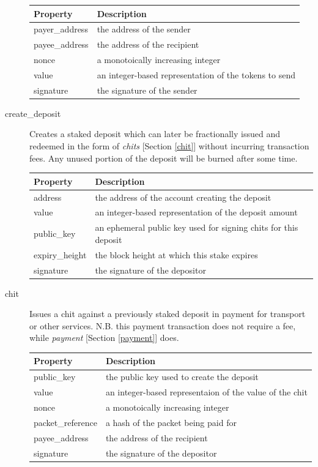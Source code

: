 \documentclass[10pt, nonatbib, nocopyrightspace, reprint]{sigplanconf}
\begin{document}
\begin{description}
\begin{table}[H]
  \centering
  \begin{tabularx}{\columnwidth}{l X}
      \toprule
      Property & Description \\ \midrule
      payer\_address & the address of the sender \\
      payee\_address & the address of the recipient \\
      nonce & a monotoically increasing integer \\
      value & an integer-based representation of the tokens to send \\
      signature & the signature of the sender
  \end{tabularx}
\end{table}

\item [create\_deposit] Creates a staked deposit which can later be fractionally issued and redeemed in the form of \emph{chits} [Section \ref{chit}] without incurring transaction fees. Any unused portion of the deposit will be burned after some time.

\begin{table}[H]
  \centering
  \begin{tabularx}{\columnwidth}{l X}
      \toprule
      Property & Description \\ \midrule
      address & the address of the account creating the deposit \\
      value & an integer-based representation of the deposit amount \\
      public\_key & an ephemeral public key used for signing chits for this deposit \\
      expiry\_height & the block height at which this stake expires \\
      signature & the signature of the depositor
  \end{tabularx}
\end{table}

\item [chit] \label{chit} Issues a chit against a previously staked deposit in payment for transport or other services. N.B. this payment transaction does not require a fee, while \emph{payment} [Section \ref{payment}] does.

\begin{table}[H]
  \centering
  \begin{tabularx}{\columnwidth}{l X}
      \toprule
      Property & Description \\ \midrule
      public\_key & the public key used to create the deposit \\
      value & an integer-based representaion of the value of the chit \\
      nonce & a monotoically increasing integer \\
      packet\_reference & a hash of the packet being paid for \\
      payee\_address & the address of the recipient \\
      signature & the signature of the depositor
  \end{tabularx}
\end{table}


\end{description}
\end{document}
